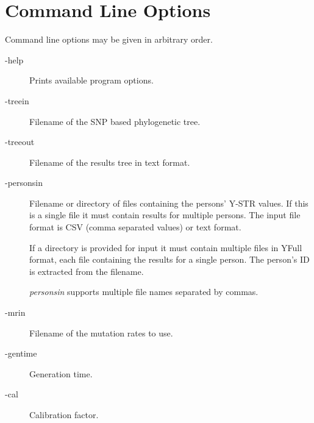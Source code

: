 \section{Command Line Options}

Command line options may be given in arbitrary order.

\begin{description}
\item[-help] Prints available program options.

\item[-treein] Filename of the SNP based phylogenetic tree.
\item[-treeout] Filename of the results tree in text format.
\item[-personsin] Filename or directory of files containing the
	persons' Y-STR values. If this is a single file it must contain
	results for multiple persons. The input file format is CSV
    (comma separated values) or text format.

	If a directory is provided for input it must contain multiple
	files in YFull format, each file containing the results for
	a single person. The person's ID is extracted from the filename.

	\emph{personsin} supports multiple file names separated by
	commas.
\item[-mrin] Filename of the mutation rates to use.
\item[-gentime] Generation time.
\item[-cal] Calibration factor.
\end{description}

